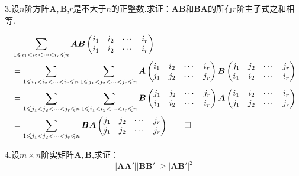 3.设$n$阶方阵$\bm{A},\bm{B}$,$r$是不大于$n$的正整数.求证：$\bm{AB}$和$\bm{BA}$的所有$r$阶主子式之和相等.
\begin{Proof}
\begin{align*}
    &\sum_{
        1\leqslant i_1<i_2<\cdots<i_r\leqslant n
    }\bm{AB}\begin{pmatrix}
        i_1&i_2&\cdots&i_r\\
        i_1&i_2&\cdots&i_r
    \end{pmatrix}\\
    &=\sum_{
        1\leqslant i_1<i_2<\cdots<i_r\leqslant n
    }\sum_{
        1\leqslant j_1<j_2<\cdots<j_r\leqslant n
    }\bm{A}\begin{pmatrix}
        i_1&i_2&\cdots&i_r\\
        j_1&j_2&\cdots&j_r
    \end{pmatrix}
    \bm{B}\begin{pmatrix}
        j_1&j_2&\cdots&j_r\\
        i_1&i_2&\cdots&i_r
    \end{pmatrix}\\
    &=\sum_{
        1\leqslant j_1<j_2<\cdots<j_r\leqslant n
    }
    \sum_{
        1\leqslant i_1<i_2<\cdots<i_r\leqslant n
    }
    \bm{B}\begin{pmatrix}
        j_1&j_2&\cdots&j_r\\
        i_1&i_2&\cdots&i_r
    \end{pmatrix}
    \bm{A}\begin{pmatrix}
        i_1&i_2&\cdots&i_r\\
        j_1&j_2&\cdots&j_r
    \end{pmatrix}\\
    &=\sum_{
        1\leqslant j_1<j_2<\cdots<j_r\leqslant n
    }\bm{BA}\begin{pmatrix}
        j_1&j_2&\cdots&j_r\\
        j_1&j_2&\cdots&j_r
    \end{pmatrix}\qedhere
\end{align*}
\end{Proof}
4.设$m\times n$阶实矩阵$\bm{A},\bm{B}$,求证：
\[
\left|
    \bm{AA}'
\right|\left|
    \bm{BB}'
\right|\geqslant\left|
    \bm{AB}'
\right|^2
\]
